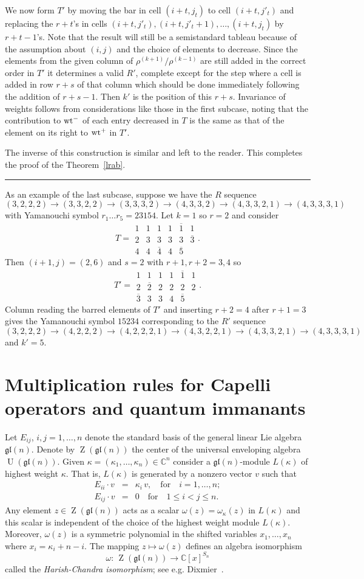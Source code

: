 \documentclass[titlepage,12pt]{article}
\newcommand{\barr}{\begin{array}}
\newcommand{\earr}{\end{array}}
\newcommand{\bea}{\begin{eqnarray*}}
\newcommand{\eea}{\end{eqnarray*}}
\newcommand{\Qed}{\rule{1ex}{1ex} \medskip}
\newcommand{\ol}{\overline}
\newcommand{\qmq}[1]{\quad\mbox{#1}\quad}
\newcommand{\0}{{\bf 0}}
\newcommand{\1}{{\bf 1}}
\newcommand{\2}{{\bf 2}}
\newcommand{\3}{{\bf 3}}
\newcommand{\4}{{\bf 4}}
\newcommand{\5}{{\bf 5}}
\newcommand{\6}{{\bf 6}}
\newcommand{\7}{{\bf 7}}
\newcommand{\8}{{\bf 8}}
\newcommand{\9}{{\bf 9}}
\newcommand{\wt}{\mathop{\rm wt}\nolimits}
\newcommand{\U}{\mathop{U}}
\newcommand{\Z}{\mathop{Z}}
\newcommand{\C}{\mathbb{C}}
\newcommand{\gl}{\mathfrak{gl}}
\newcommand{\ts}{\,}
\begin{document}
We now form $T'$ by moving the bar in cell $(i+t,j_t)$ to cell $(i+t,j'_t)$
and replacing the $r+t$'s in cells
$(i+t,j'_t),(i+t,j'_t+1),\ldots,(i+t,j_t)$
by $r+t-1$'s.  Note that the result will still be a semistandard
tableau because of the assumption about $(i,j)$ and the choice of
elements to decrease.  Since the
elements from the given column of $\rho^{(k+1)}/\rho^{(k-1)}$ are
still added in the correct order in $T'$ it determines a valid $R'$,
complete except for the step where a cell is added in row $r+s$ of that
column which should be done immediately following the addition of
$r+s-1$.  Then $k'$ is the position of this $r+s$.  Invariance of
weights follows from considerations like those in the first
subcase, noting that the contribution to $\wt^-$ of each entry decreased in
$T$
is the same as that of the element on its right to $\wt^+$
in $T'$.


The inverse of this construction is similar and left to the reader.
This completes the proof of the Theorem~\ref{lrab}.\hfill\Qed


As an example of the last subcase, suppose we have the $R$ sequence
$$
(3,2,2,2)\to(3,3,2,2)\to(3,3,3,2)\to(4,3,3,2)\to(4,3,3,2,1)\to(4,3,3,3,1)
$$
with Yamanouchi symbol $r_1\ldots r_5=23154$.  Let $k=1$ so $r=2$ and
consider
$$
T=\barr{cccccc}
1	&1	&1	&1	&\ol{1}	&1\\
2	&3	&3	&3	&3	&\ol{3}\\
4	&4	&\ol{4}	&4	&\ol{5}
\earr.
$$
Then $(i+1,j)=(2,6)$ and $s=2$ with $r+1,r+2=3,4$ so
$$
T'=\barr{cccccc}
1	&1	&1	&1	&\ol{1}	&1\\
2	&\ol{2}	&2	&2	&2	&2\\
\ol{3}	&3	&3	&4	&\ol{5}
\earr.
$$
Column reading the barred elements of $T'$ and inserting $r+2=4$ after
$r+1=3$ gives the Yamanouchi symbol $15234$ corresponding to the $R'$
sequence
$$
(3,2,2,2)\!\to\!(4,2,2,2)\!\to\!(4,2,2,2,1)\!\to\!(4,3,2,2,1)\!\to\!(4,3,3,2
,1)
\!\to\!(4,3,3,3,1)
$$
and $k'=5$.

\section{Multiplication rules for Capelli operators and quantum
immanants} 			\label{mrc}

Let $E_{ij}$, $i,j=1,\dots,n$ denote the standard basis
of the general linear Lie algebra $\gl(n)$. Denote by $\Z(\gl(n))$
the center of the universal enveloping algebra $\U(\gl(n))$.
Given $\kappa=(\kappa_1,\dots,\kappa_n)\in\C^n$ consider
a $\gl(n)$-module $L(\kappa)$ of
highest weight $\kappa$. That is, $L(\kappa)$ is generated by
a nonzero vector $v$ such that
\bea
E_{ii}\cdot v&=&\kappa_i\ts v,\qmq{for}i=1,\dots,n;\\
E_{ij}\cdot v&=&0 \qmq{for}1\leq i<j\leq n.
\eea
Any element $z\in \Z(\gl(n))$ acts as a scalar 
$\omega(z)=\omega_{\kappa}(z)$ in $L(\kappa)$
and this scalar is independent of
the choice of the highest weight module $L(\kappa)$. Moreover, $\omega(z)$
is a symmetric polynomial in the shifted variables $x_1,\dots,x_n$
where $x_i=\kappa_i+n-i$. The mapping $z\mapsto\omega(z)$ defines
an algebra isomorphism
$$
\omega:\ts \Z(\gl(n))\to \C[x]^{S_n}
$$
called the {\it Harish-Chandra isomorphism\/}; 
see e.g. Dixmier~\cite[Section 7.4]{dix:ae}.
\end{document}

